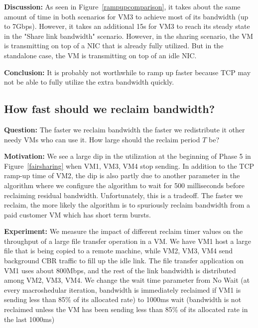 {\bf Discussion:} As seen in Figure~\ref{rampupcomparison}, it takes about the
same amount of time in both scenarios for VM3 to achieve most of its bandwidth
(up to 7Gbps). However, it takes an additional 15s for VM3 to reach its steady
state  in the "Share link bandwidth" scenario. However, in the sharing scenario,
the VM is transmitting on top of a NIC that is already fully utilized.
But in the standalone case, the VM is transmitting on top of an idle NIC. 

{\bf Conclusion:} It is probably not worthwhile 
to ramp up faster because TCP may not be able to fully utilize the extra
bandwidth quickly.

\subsection{How fast should we reclaim bandwidth?}
\label{reclaimbw}
{\bf Question:}  The faster we reclaim bandwidth the
faster we redistribute it other needy VMs who can use it. How large should the
reclaim period $T$ be?

{\bf Motivation:} 
We see a large dip in the utilization at the beginning of Phase 5 in
Figure~\ref{fairsharing} when VM1, VM3, VM4 stop sending.  In addition to the
TCP ramp-up time of VM2, the dip is also partly due to another parameter in the
algorithm where we configure the algorithm to wait for 500 milliseconds before
reclaiming residual bandwidth.  Unfortunately, this is a tradeoff.  The faster we
reclaim, the more likely the algorithm is to spuriously reclaim bandwidth from a
paid customer VM which has short term bursts.

{\bf Experiment:} We measure the impact of different reclaim timer values on the
throughput of a large file transfer operation in a VM.  We have VM1 host a large
file that is being copied to a remote machine, while VM2, VM3, VM4 send background CBR traffic
to fill up the idle link.  The file transfer application on
VM1 uses about 800Mbps, and the rest of the link bandwidth is distributed among
VM2, VM3, VM4.  We change the wait time parameter from No Wait (at every
macroshedular iteration, bandwidth is immediately reclaimed if VM1 is
sending less than 85\% of its allocated rate) to 1000ms wait (bandwidth is not
reclaimed unless the VM has been sending less than 85\% of its allocated rate in
the last 1000ms)


